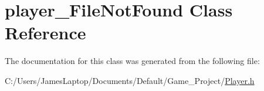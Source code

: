\hypertarget{classplayer___file_not_found}{}\section{player\+\_\+\+File\+Not\+Found Class Reference}
\label{classplayer___file_not_found}


The documentation for this class was generated from the following file\+:\begin{DoxyCompactItemize}
\item 
C\+:/\+Users/\+James\+Laptop/\+Documents/\+Default/\+Game\+\_\+\+Project/\hyperlink{_player_8h}{Player.\+h}\end{DoxyCompactItemize}
